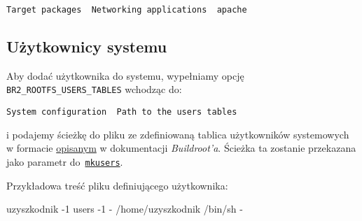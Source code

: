 \documentclass{article}
\newenvironment{textfile}{\ttfamily}{\par}
\begin{document}
\begin{center}
\texttt{Target packages \textrightarrow\ Networking applications \textrightarrow\ apache}
\end{center}


\subsection{Użytkownicy systemu}

Aby dodać użytkownika do systemu, wypełniamy opcję \texttt{BR2\_ROOTFS\_USERS\_TABLES} wchodząc do:

\begin{center}
\texttt{System configuration \textrightarrow\ Path to the users tables}
\end{center}

\noindent i podajemy ścieżkę do pliku ze zdefiniowaną tablica użytkowników systemowych w formacie \href{https://buildroot.org/downloads/manual/manual.html#makeuser-syntax}{opisanym} w dokumentacji \emph{Buildroot'a}. Ścieżka ta zostanie przekazana jako parametr do~\href{https://github.com/maximeh/buildroot/blob/master/support/scripts/mkusers}{\texttt{mkusers}}.

\noindent Przykładowa treść pliku definiującego użytkownika:

\begin{center}
\begin{textfile}
uzyszkodnik -1 users -1 - /home/uzyszkodnik /bin/sh -
\end{textfile}
\end{center}


%
%
\end{document}
